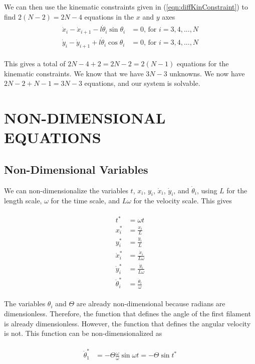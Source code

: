 \documentclass[12pt,letterpaper,titlepage]{article}
\begin{document}
We can then use the kinematic constraints given in (\ref{eqn:diffKinConstraint}) to find $2(N-2) = 2N - 4$ equations in the $x$ and $y$ axes
\begin{align}
\begin{split}
\dot{x}_{i} - \dot{x}_{i+1} - l \dot{\theta}_i \sin \theta_i &= 0 \text{, for } i = 3,4,...,N \\
\dot{y}_{i} - \dot{y}_{i+1} + l \dot{\theta}_i \cos \theta_i &= 0 \text{, for } i = 3,4,...,N
\end{split}
\end{align}

This gives a total of $2N-4 + 2 = 2N - 2 = 2(N-1)$ equations for the kinematic constraints. We know that we have $3N-3$ unknowns. We now have $2N - 2 + N - 1= 3N - 3$ equations, and our system is solvable.

\newpage
\section{NON-DIMENSIONAL EQUATIONS}
\subsection{Non-Dimensional Variables}
We can non-dimensionalize the variables $t$, $x_i$, $y_i$, $\dot{x}_i$, $\dot{y}_i$, and $\dot{\theta}_i$, using $L$ for the length scale, $\omega$ for the time scale, and $L \omega$ for the velocity scale. This gives

\begin{align}
\begin{split}
t^* &= \omega t \\
x_i^*&= \frac{x_i}{L} \\
y_i^* &= \frac{y_i}{L} \\
\dot{x}_i^* &= \frac{\dot{x}_i}{L \omega} \\
\dot{y}_i^* &= \frac{\dot{y}_i}{L \omega} \\
\dot{\theta}_i^* &= \frac{\dot{\theta}_i}{\omega}
\end{split}
\end{align}

The variables $\theta_i$ and $\Theta$ are already non-dimensional because radians are dimensionless. Therefore, the function that defines the angle of the first filament is already dimensionless. However, the function that defines the angular velocity is not. This function can be non-dimensionalized as

\begin{align}
\begin{split}
\dot{\theta}_1^* &= - \Theta \frac{\omega}{\omega} \sin \omega t = - \Theta \sin t^*
\end{split}
\end{align}
\end{document}
